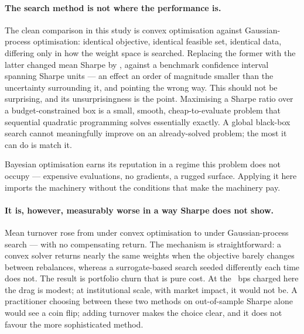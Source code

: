 
\paragraph{The search method is not where the performance is.} The clean
comparison in this study is convex optimisation against Gaussian-process
optimisation: identical objective, identical feasible set, identical data,
differing only in how the weight space is searched. Replacing the former with the
latter changed mean Sharpe by \optimiserDelta{}, against a benchmark confidence
interval spanning \benchCIWidth{} Sharpe units --- an effect an order of magnitude
smaller than the uncertainty surrounding it, and pointing the wrong way. This
should not be surprising, and its unsurprisingness
is the point. Maximising a Sharpe ratio over a budget-constrained box is a small,
smooth, cheap-to-evaluate problem that sequential quadratic programming solves
essentially exactly. A global black-box search cannot meaningfully improve on an
already-solved problem; the most it can do is match it.

Bayesian optimisation earns its reputation in a regime this problem does not
occupy --- expensive evaluations, no gradients, a rugged surface. Applying it here
imports the machinery without the conditions that make the machinery pay.

\paragraph{It is, however, measurably worse in a way Sharpe does not show.} Mean
turnover rose from \convexTurnover{} under convex optimisation to \gpTurnover{}
under Gaussian-process search --- with no compensating return. The mechanism is
straightforward: a convex solver returns nearly the same weights when the
objective barely changes between rebalances, whereas a surrogate-based search
seeded differently each time does not. The result is portfolio churn that is pure
cost. At the \costBps{}~bps charged here the drag is modest; at institutional
scale, with market impact, it would not be. A practitioner choosing between these
two methods on out-of-sample Sharpe alone would see a coin flip; adding turnover
makes the choice clear, and it does not favour the more sophisticated method.

